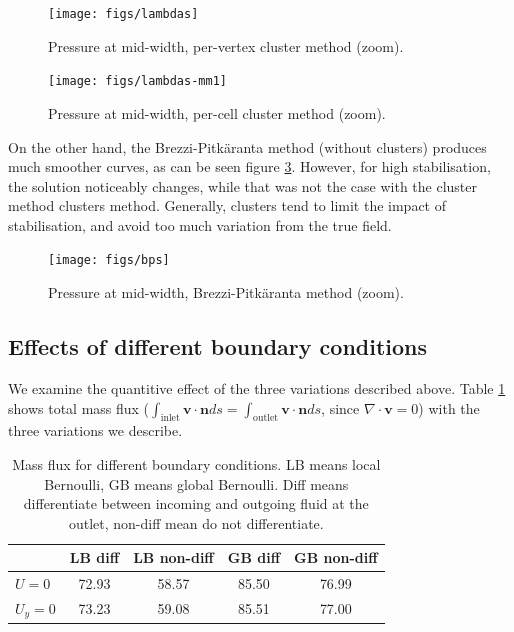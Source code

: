 \documentclass[12pt]{article}
\newcommand{\vb}[1]{\ensuremath{\boldsymbol #1}}
\begin{document}
\begin{figure}[h!]
\centering
\texttt{[image: figs/lambdas]}
\caption{Pressure at mid-width, per-vertex cluster method (zoom).}
\label{fig:lambdas}
\end{figure}


\begin{figure}[h!]
\centering
\texttt{[image: figs/lambdas-mm1]}
\caption{Pressure at mid-width, per-cell cluster method (zoom).}
\label{fig:lambdas-mm1}
\end{figure}

On the other hand, the Brezzi-Pitk\"aranta method (without clusters)
produces much smoother curves, as can be seen figure
\ref{fig:bps}. However, for high stabilisation, the solution
noticeably changes, while that was not the case with the cluster
method clusters method. Generally, clusters tend to limit the impact
of stabilisation, and avoid too much variation from the true field.

\begin{figure}[h!]
\centering
\texttt{[image: figs/bps]}
\caption{Pressure at mid-width, Brezzi-Pitk\"aranta method (zoom).}
\label{fig:bps}
\end{figure}
\subsection{Effects of different boundary conditions}
\label{effect-bc}
We examine the quantitive effect of the three variations described
above. Table \ref{table:debits} shows total mass flux
($\int_{\text{inlet}} \vb{v} \cdot \vb{n} ds = \int_{\text{outlet}}
\vb{v} \cdot \vb{n} ds$, since $\nabla \cdot \vb v = 0$) with the
three variations we describe.


\begin{table}[!h]
  \centering
  \begin{tabular}{|l|c|c|c|c|}
    \hline
    & LB diff & LB non-diff & GB diff & GB non-diff \\
    \hline
    $U = 0$ & 72.93 & 58.57 & 85.50 & 76.99\\
    $U_y = 0$ & 73.23 & 59.08 & 85.51 & 77.00 \\
    \hline
  \end{tabular}
  \caption[Mass flux for different boundary conditions]{Mass flux for different boundary conditions. LB means local
  Bernoulli, GB means global Bernoulli. Diff means differentiate
  between incoming and outgoing fluid at the outlet, non-diff mean do
  not differentiate.}
  \label{table:debits}
\end{table}
\end{document}
